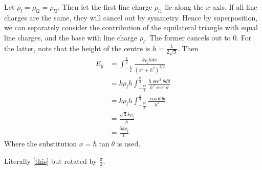 \documentclass[answers]{exam}
\begin{document}
\begin{questions}
\begin{solution}
	Let $\rho_l = \rho_{l2} = \rho_{l3}$. Then let the first line charge $\rho_{l1}$ lie along the $x$-axis. If all line charges are the same, they will cancel out by symmetry. Hence by superposition, we can separately consider the contribution of the equilateral triangle with equal line charges, and the base with line charge $\rho_l$. The former cancels out to 0. For the latter, note that the height of the centre is $h = \frac{L}{2\sqrt{3}}$. Then
	\begin{align*}
		E_y &= \int_{-\frac{L}{2}}^{\frac{L}{2}} \frac{k\rho_lhdx}{(x^2+h^2)^{3/2}} \\
		    &= k\rho_lh \int_{-\frac{pi}{3}}^{\frac{\pi}{3}} \frac{h\sec^2\theta d\theta}{h^3\sec^3\theta} \\
		    &= k\rho_lh \int_{-\frac{pi}{3}}^{\frac{\pi}{3}} \frac{\cos\theta d\theta}{h^2} \\
		    &= \frac{\sqrt{3}k\rho_l}{h} \\
		    &= \frac{6k\rho_l}{L}
	\end{align*}
	Where the substitution $x=h\tan\theta$ is used.
\end{solution}


\begin{solution}
	Literally \ref{this} but rotated by $\frac{\pi}{2}$.
\end{solution}
\end{questions}
\end{document}
